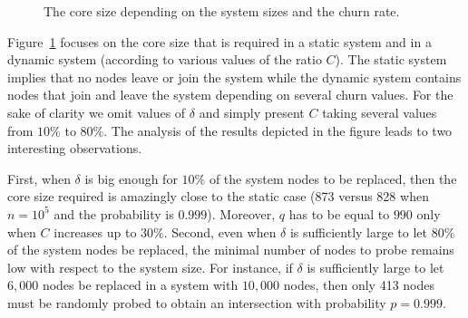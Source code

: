 \documentclass[]{llncs}
\begin{document}
\begin{figure}[!ht]
 \centering
\caption{The core size depending on the system sizes and the churn rate.}
 \label{fig:tabular}
\end{figure} 


Figure~\ref{fig:tabular} focuses on  the core size that is required in a static
system and in a dynamic system (according to various values of the ratio $C$).  
The static system implies that no nodes leave or join the system while
the dynamic system contains nodes that join and leave the system depending on
several churn values.
For the sake of clarity we omit values of $\delta$ and 
simply present $C$ taking several values from $10\%$ to $80\%$.
The analysis of the results depicted in the figure leads to two interesting 
observations.

First, when $\delta$ is big enough for $10\%$ of the system 
nodes to be replaced,  then the core size required is
amazingly close to the static case 
(873 versus 828 when $n=10^5$ and the probability is $0.999$).
Moreover, $q$ has to be equal to $990$ only when $C$ increases up to $30\%$. 
Second, even when $\delta$ is sufficiently large to let $80\%$ 
of the system nodes be replaced, the minimal number of nodes
to probe remains low with respect to the system size.  For instance, 
if $\delta$ is sufficiently large to let $6,000$ nodes be
replaced in a system with $10,000$ nodes, then only 413 nodes  must be 
randomly probed to obtain an intersection with probability $p=0.999$.
\end{document}

